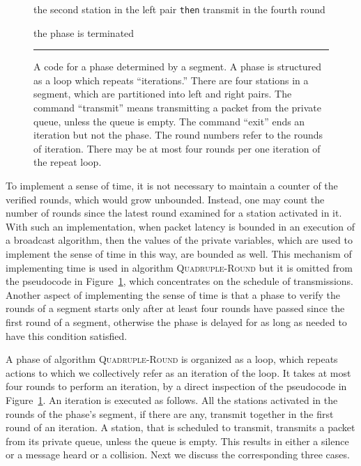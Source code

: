 \documentclass[11pt]{article}
\newcommand{\FFF}{\vspace*{\bigskipamount}}
\newcommand{\B}{\vspace*{-\smallskipamount}}
\newcommand{\BB}{\vspace*{-\medskipamount}}
\newcommand{\Item}{\B\item}
\newlength{\pagewidth}
\newlength{\captionwidth}
\begin{document}
\begin{figure}[t]
\begin{center}
\begin{minipage}{\pagewidth}
\begin{description}
\begin{description}
\begin{description}
\begin{description}
\Item[\tt else if] the second station in the left pair \texttt{then} transmit in the fourth round

\end{description}

\end{description}

\end{description}
\BB
\Item[\tt until] the phase is terminated

\end{description}

\end{minipage}
\FFF

\rule{\textwidth}{0.75pt}

\parbox{\captionwidth}{\caption{\label{alg:quadruple-round}
A code for a phase determined by a segment.
A phase is structured as a loop which repeats ``iterations.''
There are four stations in a segment, which are partitioned into left and right pairs.
The command ``transmit'' means transmitting a packet from the private queue, unless the queue is empty.
The command ``exit'' ends an iteration but not the phase.
The round numbers refer to the rounds of iteration.
There may be at most four rounds per one iteration of the repeat loop.}}
\end{center}
\end{figure}





To implement a sense of time, it is not necessary to maintain a counter of the verified rounds, which  would grow unbounded.
Instead, one may count the number of rounds since the latest round examined for a station activated in it.
With such an implementation, when packet latency is bounded in an execution of a broadcast algorithm, then the values of the private variables, which are used to implement the sense of time in this way, are bounded as well.
This mechanism of implementing time is used in algorithm \textsc{Quadruple-Round} but it is omitted from  the pseudocode in Figure~\ref{alg:quadruple-round}, which concentrates on the schedule of transmissions.
Another aspect of implementing the sense of time is that a phase to verify the rounds of a segment starts only after at least four rounds have passed since the first round of a segment, otherwise the phase is delayed for as long as needed to have this condition satisfied.


A phase of algorithm \textsc{Quadruple-Round} is organized as a loop, which repeats actions to which we collectively refer as an iteration of the loop.
It takes at most four rounds to perform an iteration, by a direct inspection of the pseudocode in Figure~\ref{alg:quadruple-round}.
An iteration is executed as follows.
All the stations activated in the rounds of the phase's segment, if there are any, transmit together in the first round of an iteration.
A station, that is scheduled to transmit, transmits a packet from its private queue, unless the queue  is empty.
This results in either a silence or a message heard or a collision. 
Next we discuss the corresponding three cases.
\end{document}

